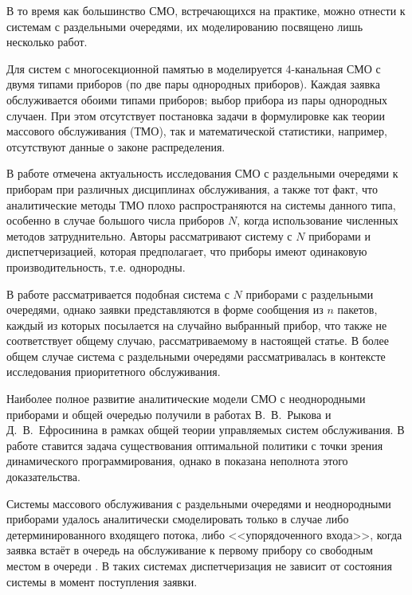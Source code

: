 В то время как большинство СМО, встречающихся на практике, можно отнести к системам с раздельными очередями, их моделированию посвящено лишь несколько работ.



Для систем с многосекционной памятью в \cite{kotenko:bib1} моделируется 4-канальная СМО с двумя типами приборов (по две пары однородных приборов). Каждая заявка обслуживается обоими типами приборов; выбор прибора из пары однородных случаен. При этом отсутствует постановка задачи в формулировке как теории массового обслуживания (ТМО), так и математической статистики, например, отсутствуют данные о законе распределения.



В работе \cite{kotenko:bib2} отмечена актуальность исследования СМО с раздельными очередями к приборам при различных дисциплинах обслуживания, а также тот факт, что аналитические методы ТМО плохо распространяются на системы данного типа, особенно в случае большого числа приборов $N$, когда использование численных методов затруднительно. Авторы рассматривают систему с $N$ приборами и диспетчеризацией, которая предполагает, что приборы имеют одинаковую производительность, т.е. однородны.



В работе \cite{kotenko:bib3} рассматривается подобная система с $N$ приборами с раздельными очередями, однако заявки представляются в форме сообщения из $n$ пакетов, каждый из которых посылается на случайно выбранный прибор, что также не соответствует общему случаю, рассматриваемому в настоящей статье. В более общем случае \cite{kotenko:bib4,kotenko:bib5} система с раздельными очередями рассматривалась в контексте исследования приоритетного обслуживания.



Наиболее полное развитие аналитические модели СМО с неоднородными приборами и общей очередью получили в работах В.~В.~Рыкова и Д.~В.~Ефросинина в рамках общей теории управляемых систем обслуживания. В работе  \cite{kotenko:bib6} ставится задача существования оптимальной политики с точки зрения динамического программирования, однако в  \cite{kotenko:bib7}  показана неполнота этого доказательства.



Системы массового обслуживания с раздельными очередями и неоднородными приборами удалось аналитически смоделировать только в случае либо детерминированного входящего потока, либо <<упорядоченного входа>>, когда заявка встаёт в очередь на обслуживание к первому прибору со свободным местом в очереди \cite{kotenko:bib8,kotenko:bib9}. В таких системах диспетчеризация не зависит от состояния системы в момент поступления заявки.


